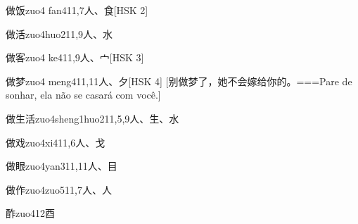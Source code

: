 \begin{EntryWithPhonetic}{做饭}{zuo4 fan4}{11,7}{⼈、⾷}[HSK 2]
\end{EntryWithPhonetic}

\begin{EntryWithPhonetic}{做活}{zuo4huo2}{11,9}{⼈、⽔}
\end{EntryWithPhonetic}

\begin{EntryWithPhonetic}{做客}{zuo4 ke4}{11,9}{⼈、⼧}[HSK 3]
\end{EntryWithPhonetic}

\begin{EntryWithPhonetic}{做梦}{zuo4 meng4}{11,11}{⼈、⼣}[HSK 4]
  [别​做​梦​了​，她​不​会​嫁​给​你​的​。===Pare de sonhar, ela não se casará com você.]
\end{EntryWithPhonetic}

\begin{EntryWithPhonetic}{做生活}{zuo4sheng1huo2}{11,5,9}{⼈、⽣、⽔}
\end{EntryWithPhonetic}

\begin{EntryWithPhonetic}{做戏}{zuo4xi4}{11,6}{⼈、⼽}
\end{EntryWithPhonetic}

\begin{EntryWithPhonetic}{做眼}{zuo4yan3}{11,11}{⼈、⽬}
\end{EntryWithPhonetic}

\begin{EntryWithPhonetic}{做作}{zuo4zuo5}{11,7}{⼈、⼈}
\end{EntryWithPhonetic}

\begin{EntryWithPhonetic}{酢}{zuo4}{12}{⾣}
\end{EntryWithPhonetic}


